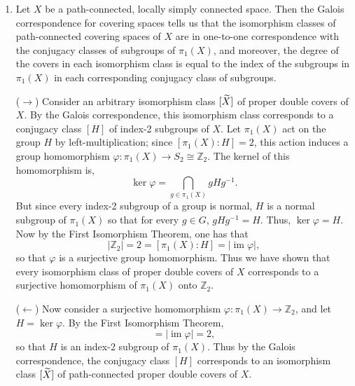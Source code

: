 \documentclass{article}
\begin{document}
	\begin{enumerate}[itemsep =-2pt,label = (\arabic{*})]
		\item Let $X$ be a path-connected, locally simply connected space. Then the Galois correspondence for covering spaces tells us that the isomorphism classes of path-connected covering spaces of $X$ are in one-to-one correspondence with the conjugacy classes of subgroups of $\pi_{1}(X)$, and moreover, the degree of the covers in each isomorphism class is equal to the index of the subgroups in $\pi_{1}(X)$ in each corresponding conjugacy class of subgroups. 
		
		($\longrightarrow$) Consider an arbitrary isomorphism class $[\widetilde{X}]$ of proper double covers of $X$. By the Galois correspondence, this isomorphism class corresponds to a conjugacy class $[H]$ of index-2 subgroups of $X$. Let $\pi_{1}(X)$ act on the group $H$ by left-multiplication; since $[\pi_{1}(X): H] = 2$, this action induces a group homomorphism $\varphi: \pi_{1}(X) \to S_{2} \cong \mathbb{Z}_{2}$. The kernel of this homomorphism is, 
		\begin{equation*}
			\ker{\varphi} = \bigcap_{g \in \pi_{1}(X)}gHg^{-1}. 
		\end{equation*}
		But since every index-2 subgroup of a group is normal, $H$ is a normal subgroup of $\pi_{1}(X)$ so that for every $g \in G$, $gHg^{-1} = H$. Thus, $\ker{\varphi} = H$. Now by the First Isomorphism Theorem, one has that 
		\begin{equation*}
			|\mathbb{Z}_{2}| = 2 = [\pi_{1}(X): H] = |\operatorname{im}{\varphi}|, 
		\end{equation*}
		so that $\varphi$ is a surjective group homomorphism. Thus we have shown that every isomorphism class of proper double covers of $X$ corresponds to a surjective homomorphism of $\pi_{1}(X)$ onto $\mathbb{Z}_{2}$. 
		
		($\longleftarrow$) Now consider a surjective homomorphism $\varphi: \pi_{1}(X) \to \mathbb{Z}_{2}$, and let $H = \ker{\varphi}$. By the First Isomorphism Theorem, 
		\begin{equation*}
			[\pi_{1}(X): H] = |\operatorname{im}{\varphi}| = 2, 
		\end{equation*}
		so that $H$ is an index-2 subgroup of $\pi_{1}(X)$. Thus by the Galois correspondence, the conjugacy class $[H]$ corresponds to an isomorphism class $[\widetilde{X}]$ of path-connected proper double covers of $X$. 
		

\end{enumerate}
\end{document}
